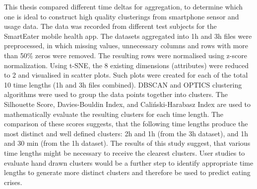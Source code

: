 
This thesis compared different time deltas for aggregation, to determine which one is ideal to construct high quality clusterings from smartphone sensor and usage data. The data was recorded from different test subjects for the SmartEater mobile health app. The datasets aggregated into 1h and 3h files were preprocessed, in which missing values, unnecessary columns and rows with more than 50\% zeros were removed. The resulting rows were normalised using z-score normalization. Using t-SNE, the 8 existing dimensions (attributes) were reduced to 2 and visualised in scatter plots. Such plots were created for each of the total 10 time lengths (1h and 3h files combined). DBSCAN and OPTICS clustering algorithms were used to group the data points together into clusters. The Silhouette Score, Davies-Bouldin Index, and Caliński-Harabasz Index are used to mathematically evaluate the resulting clusters for each time length. The comparison of these scores suggests, that the following time lengths produce the most distinct and well defined clusters: 2h and 1h (from the 3h dataset), and 1h and 30 min (from the 1h dataset). The results of this study suggest, that various time lengths might be necessary to receive the clearest clusters. User studies to evaluate hand drawn clusters would be a further step to identify appropriate time lengths to generate more distinct clusters and therefore be used to predict eating crises.
